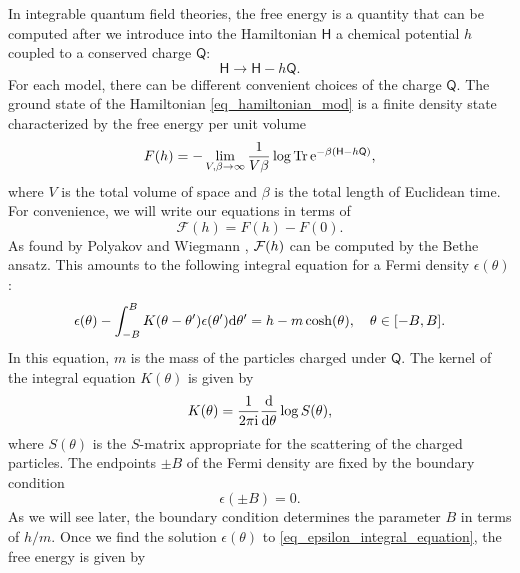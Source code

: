 \documentclass[a4paper,11pt]{article}
\theoremstyle{definition}
\newcommand{\CF}{{\cal F}}
\newcommand{\mQ}{\mathsf{Q}}
\DeclareMathOperator{\Tr}{Tr}
\newcommand{\re}{{\rm e}}
\newcommand{\ri}{{\rm i}}
\newcommand{\rd}{{\rm d}}
\begin{document}
In integrable quantum field theories, the free energy is a quantity that can be computed after we 
introduce into the Hamiltonian $\mathsf{H}$ a chemical potential $h$ coupled to a conserved charge $\mathsf{Q}$:
%
\begin{equation}
\mathsf{H} \rightarrow \mathsf{H} - h \mathsf{Q}.
\label{eq_hamiltonian_mod}
\end{equation}
%
For each model, there can be different convenient choices of the charge $\mathsf{Q}$. 
The ground state of the Hamiltonian \eqref{eq_hamiltonian_mod} is a finite density state characterized by the free energy per unit volume
%
\begin{equation}
F(h) = -\lim_{V, \beta \rightarrow \infty} {1\over V\beta } \log {\Tr}\,  \re^{-\beta (\mathsf{H}-h \mathsf{Q})},
\end{equation}
%
where $V$ is the total volume of space and $\beta$ is the total length of Euclidean time. For convenience, we will write our 
equations in terms of
%
\begin{equation}
\label{subF}
\mathcal{F}(h) = F(h) - F(0).
\end{equation}
%
As found by Polyakov and Wiegmann \cite{pw,wiegmann}, $\CF(h)$ can be computed by the Bethe ansatz. This amounts to 
the following integral equation for a Fermi density $\epsilon(\theta)$:
%
\begin{equation}
\epsilon(\theta)-\int_{-B}^B K(\theta-\theta') \epsilon (\theta') \rd \theta' = h-m \cosh(\theta),\quad \theta \in[-B,B].
\label{eq_epsilon_integral_equation}
\end{equation}
%
In this equation, $m$ is the mass of the particles charged under $\mQ$. The kernel of the integral equation $K(\theta)$ is given by 
%
\begin{equation}
K(\theta) = \frac{1}{2\pi\ri} \frac{\rd}{\rd \theta} \log S(\theta),
\end{equation}
%
where $S(\theta)$ is the $S$-matrix appropriate for the scattering of the charged particles. 
The endpoints $\pm B$ of the Fermi density are fixed by the boundary condition
%
\begin{equation}
\epsilon(\pm B) = 0.
\label{eq_boundary_condition_0}
\end{equation}
%
As we will see later, the boundary condition determines the parameter $B$ in terms of $h/m$. 
Once we find the solution $\epsilon(\theta)$ to \eqref{eq_epsilon_integral_equation}, the free energy is given by
\end{document}
